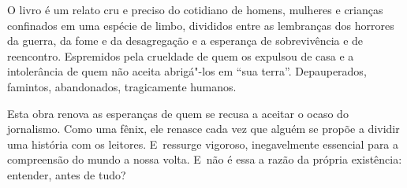 O livro é um relato cru e preciso do cotidiano de homens, mulheres e
crianças confinados em uma espécie de limbo, divididos entre as
lembranças dos horrores da guerra, da fome e da desagregação e a
esperança de sobrevivência e de reencontro. Espremidos pela crueldade de
quem os expulsou de casa e a intolerância de quem não aceita abrigá"-los
em ``sua terra''. Depauperados, famintos, abandonados, tragicamente
humanos.

Esta obra renova as esperanças de quem se recusa a aceitar o ocaso do
jornalismo. Como uma fênix, ele renasce cada vez que alguém se propõe a
dividir uma história com os leitores. E~ressurge vigoroso, inegavelmente
essencial para a compreensão do mundo a nossa volta. E~não é essa a
razão da própria existência: entender, antes de tudo?
